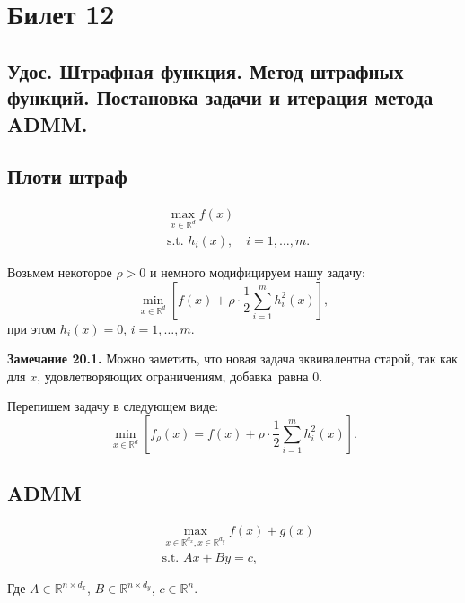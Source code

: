 \section{Билет 12}

\subsection{Удос. Штрафная функция. Метод штрафных функций. Постановка задачи и итерация метода ADMM.}

\subsection*{Плоти штраф}

\begin{equation}
    \begin{aligned}
         & \max_{x \in \mathbb{R}^d} f(x)              \\
         & \text{s.t. } h_i(x), \quad i = 1, \dots, m.
    \end{aligned}
\end{equation}

Возьмем некоторое $\rho > 0$ и немного модифицируем нашу задачу:
$$\min_{x \in \mathbb{R}^d} \left[ f(x) + \rho \cdot \frac{1}{2} \sum_{i=1}^{m} h_i^2(x) \right],$$
при этом $h_i(x) = 0$, $i = 1, \dots, m$.

\textbf{Замечание 20.1.} Можно заметить, что новая задача эквивалентна старой, так как для $x$,
удовлетворяющих ограничениям, \guillemotleft добавка\guillemetright \, равна 0.

Перепишем задачу в следующем виде:
$$\min_{x \in \mathbb{R}^d} \left[ f_{\rho}(x) = f(x) + \rho \cdot \frac{1}{2} \sum_{i=1}^{m} h_i^2(x) \right].$$

\subsection*{ADMM}

\begin{equation}
    \begin{aligned}
         & \max_{x \in \mathbb{R}^{d_x}, x \in \mathbb{R}^{d_y}} f(x) + g(x) \\
         & \text{s.t. } Ax + By = c,
    \end{aligned}
\end{equation}

Где $ A \in \mathbb{R}^{n \times d_x} $, $ B \in \mathbb{R}^{n \times d_y} $, $ c \in \mathbb{R}^{n} $.

